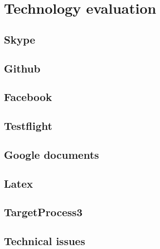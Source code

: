 \section{Technology evaluation}
\subsection{Skype}
\subsection{Github}
\subsection{Facebook}
\subsection{Testflight}
\subsection{Google documents}
\subsection{Latex}
\subsection{TargetProcess3}
\subsection{Technical issues}
